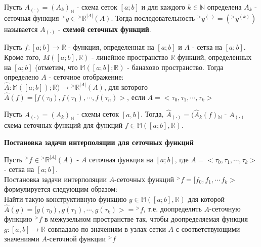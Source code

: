 \documentclass[__main__.tex]{subfiles}
\begin{document}
\begin{definition}
Пусть $A_{(\cdot)} = (A_k)_{\mathbb{N}}$ - схема сеток $[a; b]$ и для каждого $k \in \mathbb{N}$ определена $A_k$ - сеточная функция ${}^{>}y \in {}^{>} \mathbb{R}^{|A|}(A)$. Тогда последовательность ${}^{>}y^{(\cdot)} = ({}^{>}y^{(k)})$ называется $A_{(\cdot)}$ - \textbf{схемой сеточных функций}.
\end{definition}

\begin{definition}
Пусть $f : [a; b] \to \mathbb{R}$ - функция, определенная на $[a; b]$ и $A$ - сетка на $[a; b]$. Кроме того, $M([a; b], \mathbb{R})$ - линейное пространство $\mathbb{R}$ функций, определенных на $[a; b]$ (отметим, что $\mathbb{M}([a; b]; \mathbb{R})$ - банахово пространство. Тогда определено $A$ - сеточное отображение:\\ $\hat{A}: \mathbb{M}([a; b]); \mathbb{R}) \to {}^{>}\mathbb{R}^{|A|}(A)$, для которого $\hat{A}(f) = [f(\tau_0), f(\tau_1), \cdots, f(\tau_n)>$, если $A = <\tau_0, \tau_1, \cdots, \tau_k>$
\end{definition}

\begin{definition}
Пусть $A_(\cdot) = (A_k)_{\mathbb{N}}$ - схемы сеток $[a, b]$. Тогда, $\hat{A}_{(\cdot)} = (\hat{A}_ k (f) {}_{\mathbb{N}}$ - $A_{(\cdot)}$ схема сеточных функций для функций $f \in \mathbb{M}([a; b], \mathbb{R})$.
\end{definition}

\textbf{Постановка задачи интерполяции для сеточных функций}

Пусть ${}^{>}f \in {}^{>}\mathbb{R}^{|A|}(A)$ - $A$ сеточная функция на $[a; b]$, где $A = <\tau_0, \tau_1, \cdots, \tau_k>$ - сетка на $[a; b]$.\\

Постановка задачи интерполяции $A$-сеточных функций ${}^{>}f = [f_0, f_1, \cdots\, f_k>$ формулируется следующим образом:\\

Найти такую конструктивную функцию $y \in \mathbb{M}([a; b], \mathbb{R})$ для которой\\ $\hat{A}(g) = [g(\tau_0), g(\tau_1), \cdots, g(\tau_k)> = {}^{>}f$, т.е. доопределить $A$-сеточную функцию ${}^{>}f$ в межузельном пространстве так, чтобы доопределяемая функция $g: [a, b] \to \mathbb{R}$ совпадало по значениям в узлах сетки $A$ с соответствующими значениями $A$-сеточной функции ${}^{>}f$
\end{document}
